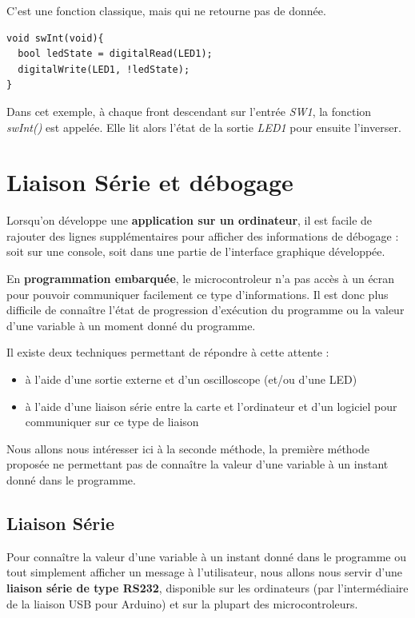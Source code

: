 \documentclass[a4paper,11pt,titlepage]{article} %
\begin{document}
C'est une fonction classique, mais qui ne retourne pas de donnée.

\begin{lstlisting}
void swInt(void){
  bool ledState = digitalRead(LED1);
  digitalWrite(LED1, !ledState);
} 
\end{lstlisting}

Dans cet exemple, à chaque front descendant sur l'entrée \textsl{SW1}, la fonction \textsl{swInt()} est appelée. Elle lit alors l'état de la sortie \textsl{LED1} pour ensuite l'inverser.

\newpage
\section{Liaison Série et débogage}

Lorsqu'on développe une \textbf{application sur un ordinateur}, il est facile de rajouter des lignes supplémentaires pour afficher des informations de débogage : soit sur une console, soit dans une partie de l'interface graphique développée.

En \textbf{programmation embarquée}, le microcontroleur n'a pas accès à un écran pour pouvoir communiquer facilement ce type d'informations. Il est donc plus difficile de connaître l'état de progression d'exécution du programme ou la valeur d’une variable à un moment donné du programme.

Il existe deux techniques permettant de répondre à cette attente :

\begin{itemize}
	\item à l'aide d'une sortie externe et d'un oscilloscope (et/ou d'une LED)
	\item à l'aide d'une liaison série entre la carte et l'ordinateur et d'un logiciel pour communiquer sur ce type de liaison
\end{itemize}

Nous allons nous intéresser ici à la seconde méthode, la première méthode proposée ne permettant pas de connaître la valeur d'une variable à un instant donné dans le programme.

\subsection{Liaison Série}

Pour connaître la valeur d'une variable à un instant donné dans le programme ou tout simplement afficher un message à l'utilisateur, nous allons nous servir d'une \textbf{liaison série de type RS232}, disponible sur les ordinateurs (par l'intermédiaire de la liaison USB pour Arduino) et sur la plupart des microcontroleurs.
\end{document}
